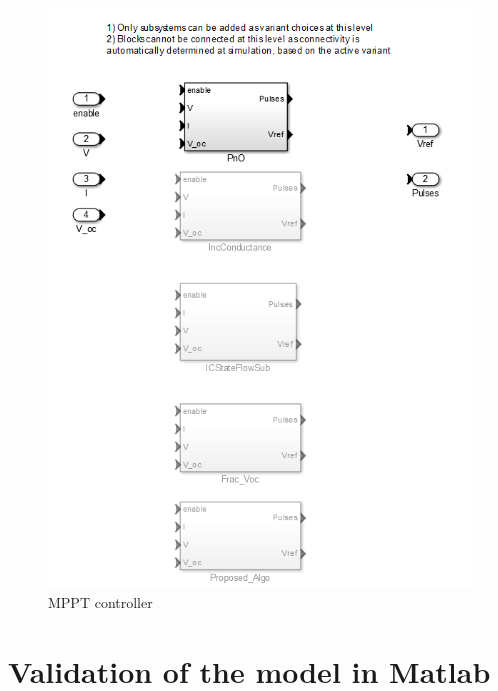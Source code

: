 \begin{figure}[H]
  \begin{center}
	  \includegraphics[width=\textwidth]{images/controller_mod}
	  \caption{MPPT controller }
	  \label{fig:Controller_mod}
  \end{center}
\end{figure}
 



\section {Validation of the model in Matlab{\textregistered}}\label{sec:Validation} 

